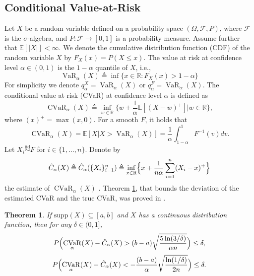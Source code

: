 \documentclass[acmlarge, manuscript, screen, review, natbib=false, oneside]{acmart}
\newtheorem{theorem}{Theorem}[section]
\DeclareMathOperator{\CVaR}{CVaR}
\DeclareMathOperator{\VaR}{VaR}
\begin{document}
\subsection{Conditional Value-at-Risk}\label{sec:cvar_preliminaries}
Let $X$ be a random variable defined on a probability space $(\Omega, \mathcal{F}, P)$, where $\mathcal{F}$ is the $\sigma$-algebra, and $P : \mathcal{F} \to [0,1]$ is a probability measure. Assume further that $\mathbb{E}[|X|] < \infty$. We denote the cumulative distribution function (CDF) of the random variable $X$ by $F_X(x)=P(X\leq x)$. The value at risk at confidence level $\alpha \in (0,1)$ is the $1-\alpha$ quantile of $X$, i.e., \begin{equation}
	\VaR_\alpha (X) \triangleq \inf\{x\in \mathbb{R}:F_X(x) > 1-\alpha\}
\end{equation}
For simplicity we denote $q_\alpha^X=\VaR_\alpha(X)$ or $q_\alpha^F=\VaR_\alpha(X)$. The conditional value at risk (CVaR) at confidence level $\alpha$ is defined as \cite{rockafellar2000optimization}
\begin{equation}
	\CVaR_\alpha(X) \triangleq \inf_{w\in \mathbb{R}}\{w+\frac{1}{\alpha}\mathbb{E}[(X-w)^+]|w\in \mathbb{R}\},
\end{equation}
where $(x)^+=\max{(x,0)}$. For a smooth $F$, it holds that \cite{pflug2000some}
\begin{equation}\label{def:cvar_as_conditional_expectation}
	\CVaR_\alpha(X)=\mathbb{E}[X|X>\VaR_\alpha(X)]=\frac{1}{\alpha}\int_{1-\alpha}^1 F^{-1}(v)dv.
\end{equation}
Let $X_i \overset{\text{iid}}{\sim} F$ for $i\in\{1,\dots,n\}$. Denote by
\begin{equation}\label{eq:brown_cvar_estimator}
	\hat{C}_\alpha(X) \triangleq \hat{C}_\alpha(\{X_i\}^{n}_{i=1}) \triangleq \inf_{x\in \mathbb{R}} \Bigl{\{}x+\frac{1}{n\alpha} \sum_{i=1}^n(X_i-x)^+\Bigr{\}}
\end{equation}
the estimate of $\CVaR_\alpha(X)$ \cite{brown2007large}. Theorem \ref{thm:brown_bounds}, 
that bounds the deviation of the estimated CVaR and the true CVaR, was proved in \cite{brown2007large}.
\begin{theorem}\label{thm:brown_bounds}
	If $\text{supp}(X) \subseteq [a, b]$ and $X$ has a continuous distribution function, then for any $\delta \in (0, 1]$, 
	\begin{equation}
		P\Bigl{(}\CVaR_\alpha(X)-\hat{C}_\alpha(X)>(b-a)\sqrt{\frac{5\ln(3/\delta)}{\alpha n}}\Bigr{)}\leq \delta,
	\end{equation}
	\begin{equation}
		P\Bigl{(}\CVaR_\alpha(X)-\hat{C}_\alpha(X)<-\frac{(b-a)}{\alpha}\sqrt{\frac{\ln(1/\delta)}{2n}}\Bigr{)}\leq \delta.
	\end{equation}
\end{theorem}
\end{document}
